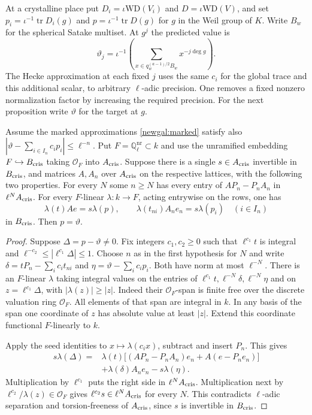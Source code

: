At a crystalline place put $D_i=\iota\mathrm{WD}(V_i)$ and
$D=\iota\mathrm{WD}(V)$, and set $p_i=\iota^{-1}\operatorname{tr}D_i(g)$
and $p=\iota^{-1}\operatorname{tr}D(g)$ for $g$ in the Weil group of $K$.
Write $B_w$ for the spherical Satake
multiset. At $g^j$ the predicted value is
\[
 \vartheta_j=\iota^{-1}\left(\sum_{x\in q_w^{(a-1)/2}B_w}x^{-j\deg g}\right).
\]
The Hecke approximation at each fixed $j$ uses the same $c_i$ for the global
trace and this additional scalar, to arbitrary $\ell$-adic precision.
One removes a fixed nonzero normalization factor by increasing the required
precision. For the next proposition write $\vartheta$ for the target at $g$.

\begin{proposition}\label{newgal:phi}
Assume the marked approximations \eqref{newgal:marked} satisfy also
$|\vartheta-\sum_{i\in I_n}c_i p_i|\le\ell^{-n}$. Put
$F=\mathbb Q_\ell^{\mathrm{nr}}\subset k$ and use the unramified embedding
$F\hookrightarrow B_{\rm cris}$ taking $\mathcal O_F$ into $A_{\rm cris}$.
Suppose there is a single $s\in A_{\rm cris}$ invertible in $B_{\rm cris}$,
and matrices $A,A_n$ over $A_{\rm cris}$ on the respective lattices, with
the following two properties. For every $N$ some $n\ge N$ has every entry
of $AP_n-P_nA_n$ in $\ell^NA_{\rm cris}$. For every $F$-linear
$\lambda:k\to F$, acting entrywise on the rows, one has
\[
 \lambda(t)Ae=s\lambda(p),\qquad
 \lambda(t_{ni})A_ne_n=s\lambda(p_i)\quad(i\in I_n)
\]
in $B_{\rm cris}$. Then $p=\vartheta$.
\end{proposition}
\begin{proof}
Suppose $\Delta=p-\vartheta\ne0$. Fix integers $c_1,c_2\ge0$ such that
$\ell^{c_1}t$ is integral and $\ell^{-c_2}\le|\ell^{c_1}\Delta|\le1$.
Choose $n$ as in the first hypothesis for $N$ and write
$\delta=tP_n-\sum_i c_i t_{ni}$ and $\eta=\vartheta-\sum_i c_i p_i$.
Both have norm at most $\ell^{-N}$. There is an $F$-linear $\lambda$
taking integral values on the entries of $\ell^{c_1}t,\ell^{-N}\delta,
\ell^{-N}\eta$ and on $z=\ell^{c_1}\Delta$, with $|\lambda(z)|\ge|z|$.
Indeed their $\mathcal O_F$-span is finite free over the discrete valuation
ring $\mathcal O_F$. All elements of that span are integral in $k$. In any
basis of the span one coordinate of $z$ has absolute value at least $|z|$.
Extend this coordinate functional $F$-linearly to $k$.

Apply the seed identities to $x\mapsto\lambda(c_i x)$, subtract and
insert $P_n$. This gives
\[
 \begin{split}
 s\lambda(\Delta)={}&\lambda(t)\big[(AP_n-P_nA_n)e_n+A(e-P_ne_n)\big]\\
                    &+\lambda(\delta) A_ne_n-s\lambda(\eta).
 \end{split}
\]
Multiplication by $\ell^{c_1}$ puts the right side in $\ell^NA_{\rm cris}$.
Multiplication next by $\ell^{c_2}/\lambda(z)\in\mathcal O_F$ gives
$\ell^{c_2}s\in\ell^NA_{\rm cris}$ for every $N$.
This contradicts $\ell$-adic separation and torsion-freeness of
$A_{\rm cris}$, since $s$ is invertible in $B_{\rm cris}$.
\end{proof}

